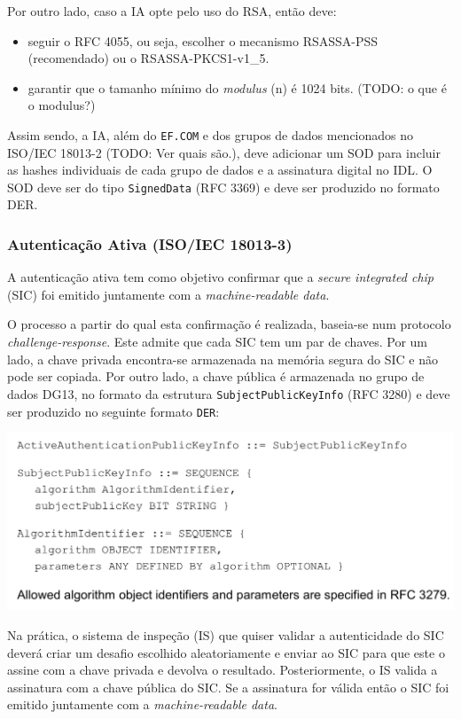 \begin{enumerate}
Por outro lado, caso a IA opte pelo uso do RSA, então deve:
\begin{itemize}
\item seguir o RFC 4055, ou seja, escolher o mecanismo RSASSA-PSS (recomendado)
ou o RSASSA-PKCS1-v1\_5.
\item garantir que o tamanho mínimo do \emph{modulus} (n) é 1024 bits. (TODO: o que é
o modulus?)
\end{itemize}

Assim sendo, a IA, além do \texttt{EF.COM} e dos grupos de dados mencionados no
ISO/IEC 18013-2 (TODO: Ver quais são.), deve adicionar um SOD para incluir
as hashes individuais de cada grupo de dados e a assinatura digital no IDL.
O SOD deve ser do tipo \texttt{SignedData} (RFC 3369) e deve ser produzido no
formato DER.

\end{enumerate}

\subsubsection{Autenticação Ativa (ISO/IEC 18013-3)}
\label{sec:org940f982}
A autenticação ativa tem como objetivo confirmar que a \emph{secure integrated
chip} (SIC) foi emitido juntamente com a \emph{machine-readable data}.

O processo a partir do qual esta confirmação é realizada, baseia-se num
protocolo \emph{challenge-response}. Este admite que cada SIC tem um par de chaves.
Por um lado, a chave privada encontra-se armazenada na memória segura do SIC
e não pode ser copiada. Por outro lado, a chave pública é armazenada no
grupo de dados DG13, no formato da estrutura \texttt{SubjectPublicKeyInfo} (RFC 3280)
e deve ser produzido no seguinte formato \texttt{DER}:

\begin{center}
\includegraphics[width=.9\linewidth]{./images/subjectPublicKeyInfo_der.jpeg}
\end{center}

Na prática, o sistema de inspeção (IS) que quiser validar a autenticidade do
SIC deverá criar um desafio escolhido aleatoriamente e enviar ao SIC para
que este o assine com a chave privada e devolva o resultado. Posteriormente,
o IS valida a assinatura com a chave pública do SIC. Se a assinatura for
válida então o SIC foi emitido juntamente com a \emph{machine-readable data}.

